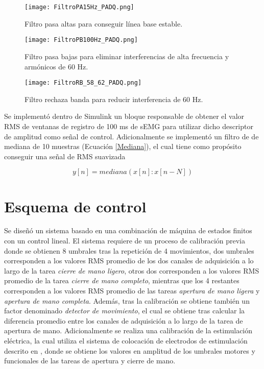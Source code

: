 \begin{figure}[htbp]
	\centering
	\texttt{[image: FiltroPA15Hz\_PADQ.png]}
	\caption{Filtro pasa altas para conseguir línea base estable.}
	\label{Figura: FiltroPA}
	
	\texttt{[image: FiltroPB100Hz\_PADQ.png]}
	\caption{Filtro pasa bajas para eliminar interferencias de alta frecuencia y armónicos de 60 Hz.} 
	\label{Figura: FiltroPB}
	
	\texttt{[image: FiltroRB\_58\_62\_PADQ.png]}
	\caption{Filtro rechaza banda para reducir interferencia de 60 Hz.}
	\label{Figura: FiltroRB}
\end{figure}

Se implementó dentro de Simulink un bloque responsable de obtener el valor RMS de ventanas de registro de 100 ms de sEMG para utilizar dicho descriptor de amplitud como señal de control. Adicionalmente se implementó un filtro de de mediana de 10 muestras (Ecuación \ref{Mediana}), el cual tiene como propósito conseguir una señal de RMS suavizada

\begin{equation}
	y[n] = mediana(x[n]:x[n-N])
	\label{Mediana}
\end{equation}

\newpage
\section{Esquema de control}
Se diseñó un sistema basado en una combinación de máquina de estados finitos con un control lineal. El sistema requiere de un proceso de calibración previa donde se obtienen 8 umbrales tras la repetición de 4 movimientos, dos umbrales corresponden a los valores RMS promedio de los dos canales de adquisición a lo largo de la tarea \emph{cierre de mano ligero}, otros dos corresponden a los valores RMS promedio de la tarea \emph{cierre de mano completo}, mientras que los 4 restantes corresponden a los valores RMS promedio de las tareas \emph{apertura de mano ligera} y \emph{apertura de mano completa}. Además, tras la calibración se obtiene también un factor denominado \emph{detector de movimiento}, el cual se obtiene tras calcular la diferencia promedio entre los canales de adquisición a lo largo de la tarea de apertura de mano. Adicionalmente se realiza una calibración de la estimulación eléctrica, la cual utiliza el sistema de colocación de electrodos de estimulación descrito en \cite{AnaMartin2019}, donde se obtiene los valores en amplitud de los umbrales motores y funcionales de las tareas de apertura y cierre de mano.

